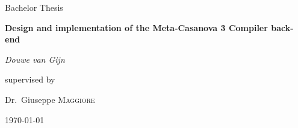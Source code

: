 \documentclass[12pt,a4paper]{report}
\begin{document}
\begin{titlepage}
	\centering
	{\Large Bachelor Thesis\par}
        \vspace{2cm}
	       {\huge\bfseries Design and implementation of the Meta-Casanova 3 Compiler back-end \par}
	\vfill
	{\Large\itshape Douwe van Gijn\par}
	\vfill
	supervised by\par
	Dr.~Giuseppe \textsc{Maggiore}
	\vfill
	{\large \today\par}
\end{titlepage}
\end{document}

